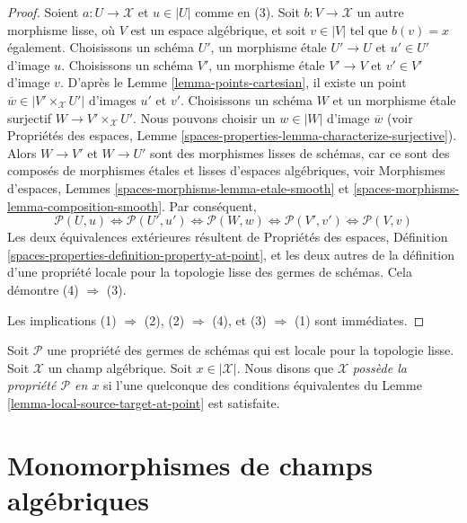 \begin{proof}
Soient $a : U \to \mathcal{X}$ et $u \in |U|$ comme en (3). Soit
$b : V \to \mathcal{X}$ un autre morphisme lisse, où $V$ est un espace
algébrique, et soit $v \in |V|$ tel que $b(v) = x$ également.
Choisissons un schéma $U'$, un morphisme \'etale $U' \to U$ et $u' \in U'$
d'image $u$. Choisissons un schéma $V'$, un morphisme \'etale $V' \to V$
et $v' \in V'$ d'image $v$. D'après le
Lemme \ref{lemma-points-cartesian},
il existe un point $\overline{w} \in |V' \times_\mathcal{X} U'|$
d'images $u'$ et $v'$. Choisissons un schéma $W$ et un morphisme \'etale surjectif
$W \to V' \times_\mathcal{X} U'$. Nous pouvons choisir un
$w \in |W|$ d'image $\overline{w}$ (voir
Propriétés des espaces,
Lemme \ref{spaces-properties-lemma-characterize-surjective}).
Alors $W \to V'$ et $W \to U'$ sont des morphismes lisses de schémas,
car ce sont des composés de morphismes \'etales et lisses d'espaces algébriques, voir
Morphismes d'espaces, Lemmes \ref{spaces-morphisms-lemma-etale-smooth} et
\ref{spaces-morphisms-lemma-composition-smooth}.
Par conséquent,
$$
\mathcal{P}(U, u)
\Leftrightarrow
\mathcal{P}(U', u')
\Leftrightarrow
\mathcal{P}(W, w)
\Leftrightarrow
\mathcal{P}(V', v')
\Leftrightarrow
\mathcal{P}(V, v)
$$
Les deux équivalences extérieures résultent de
Propriétés des espaces,
Définition \ref{spaces-properties-definition-property-at-point},
et les deux autres de la définition d'une propriété locale pour la topologie lisse
des germes de schémas. Cela démontre (4) $\Rightarrow$ (3).

\medskip\noindent
Les implications (1) $\Rightarrow$ (2), (2) $\Rightarrow$ (4),
et (3) $\Rightarrow$ (1) sont immédiates.
\end{proof}

\begin{definition}
\label{definition-property-at-point}
Soit $\mathcal{P}$ une propriété des germes de schémas qui est
locale pour la topologie lisse. Soit $\mathcal{X}$ un champ algébrique.
Soit $x \in |\mathcal{X}|$.
Nous disons que $\mathcal{X}$ {\it possède la propriété $\mathcal{P}$ en $x$}
si l'une quelconque des conditions équivalentes du
Lemme \ref{lemma-local-source-target-at-point}
est satisfaite.
\end{definition}










\section{Monomorphismes de champs algébriques}
\label{section-monomorphisms}

